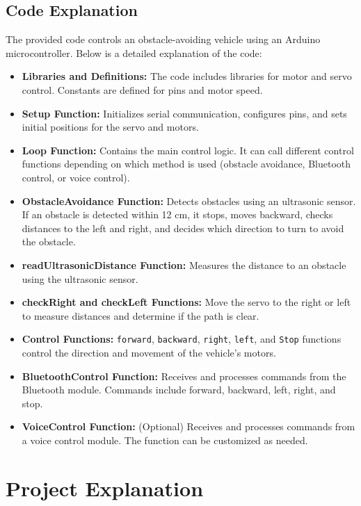 \documentclass[12pt,a4paper]{report}
\begin{document}
\section*{Code Explanation}

The provided code controls an obstacle-avoiding vehicle using an Arduino microcontroller. Below is a detailed explanation of the code:

\begin{itemize}
    \item \textbf{Libraries and Definitions:} The code includes libraries for motor and servo control. Constants are defined for pins and motor speed.
    \item \textbf{Setup Function:} Initializes serial communication, configures pins, and sets initial positions for the servo and motors.
    \item \textbf{Loop Function:} Contains the main control logic. It can call different control functions depending on which method is used (obstacle avoidance, Bluetooth control, or voice control).
    \item \textbf{ObstacleAvoidance Function:} Detects obstacles using an ultrasonic sensor. If an obstacle is detected within 12 cm, it stops, moves backward, checks distances to the left and right, and decides which direction to turn to avoid the obstacle.
    \item \textbf{readUltrasonicDistance Function:} Measures the distance to an obstacle using the ultrasonic sensor.
    \item \textbf{checkRight and checkLeft Functions:} Move the servo to the right or left to measure distances and determine if the path is clear.
    \item \textbf{Control Functions:} \texttt{forward}, \texttt{backward}, \texttt{right}, \texttt{left}, and \texttt{Stop} functions control the direction and movement of the vehicle's motors.
    \item \textbf{BluetoothControl Function:} Receives and processes commands from the Bluetooth module. Commands include forward, backward, left, right, and stop.
    \item \textbf{VoiceControl Function:} (Optional) Receives and processes commands from a voice control module. The function can be customized as needed.
\end{itemize}


\chapter*{Project Explanation}
\end{document}
